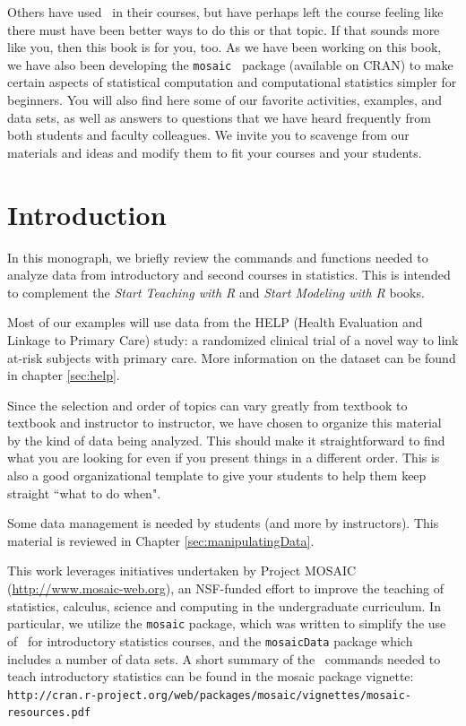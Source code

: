 \documentclass{tufte-book}\usepackage[]{graphicx}\usepackage[]{xcolor}
\renewcommand{\pkg}[1]{{\color{black}\texttt{#1}}}
\begin{document}
Others have used \R\ in their courses, but have perhaps left the course feeling
like there must have been better ways to do this or that topic.  If that
sounds more like you, then this book is for you, too.  As we have been working 
on this book, we have also been developing the \pkg{mosaic}
\R\ package (available on CRAN) to make certain aspects of statistical
computation and computational statistics simpler for beginners.  
You will also find here some of our favorite activities, examples, and data
sets, as well as answers to questions that we have heard frequently from both students
and faculty colleagues.  We invite you to scavenge from our materials and ideas 
and modify them to fit your courses and your students.


\chapter{Introduction}


\vspace*{-.5cm}

In this monograph, we briefly review the commands and functions needed to analyze data from introductory and second courses in statistics.  This is intended to complement the \emph{Start Teaching with R} and \emph{Start Modeling with R} books.

Most of our examples will use data from the HELP (Health Evaluation and Linkage to Primary Care) study: a randomized clinical trial of a novel way to link at-risk subjects with primary care.  More information on the dataset can be found in chapter \ref{sec:help}.


Since the selection and order of topics can vary greatly from 
textbook to textbook and instructor to instructor, we have chosen to 
organize this material by the kind of data being analyzed.  This should make it straightforward to find what you are looking for even if you present things in a different order.  This is also a good organizational template to give your students to help them keep straight ``what to do when".

Some data management is needed by students (and more by instructors).  This
material is reviewed in Chapter \ref{sec:manipulatingData}.

%
This work leverages initiatives undertaken by Project MOSAIC (\url{http://www.mosaic-web.org}), an NSF-funded effort to improve the teaching of statistics, calculus, science and computing in the undergraduate curriculum. In particular, we utilize the \pkg{mosaic} package, which was written to simplify the use of \R\ for introductory statistics courses, and the \pkg{mosaicData} package which includes a number of data sets. A short summary of the \R\ commands needed to teach introductory statistics can be found in the mosaic package vignette:\\
\verb+http://cran.r-project.org/web/packages/mosaic/vignettes/mosaic-resources.pdf+
\end{document}
